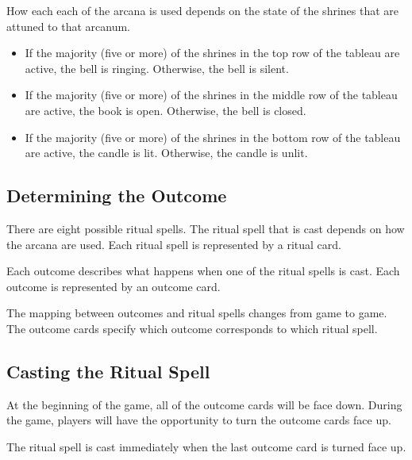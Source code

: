 \documentclass[10pt, parskip=half-, twoside]{scrartcl}
\begin{document}
How each each of the arcana is used depends on the state of the shrines that are attuned to that arcanum.
\begin{itemize}[itemindent=*, leftmargin=*]
\item If the majority (five or more) of the shrines in the top row of the tableau are active, the bell is ringing. Otherwise, the bell is silent.
\item If the majority (five or more) of the shrines in the middle row of the tableau are active, the book is open. Otherwise, the bell is closed.
\item If the majority (five or more) of the shrines in the bottom row of the tableau are active, the candle is lit. Otherwise, the candle is unlit.
\end{itemize}

\newpage

\subsection*{Determining the Outcome}
There are eight possible ritual spells.
The ritual spell that is cast depends on how the arcana are used.
Each ritual spell is represented by a ritual card.

Each outcome describes what happens when one of the ritual spells is cast. 
Each outcome is represented by an outcome card.

The mapping between outcomes and ritual spells changes from game to game. The outcome cards specify which outcome corresponds to which ritual spell.

\subsection*{Casting the Ritual Spell}
At the beginning of the game, all of the outcome cards will be face down. During the game, players will have the opportunity to turn the outcome cards face up.

The ritual spell is cast immediately when the last outcome card is turned face up.

\newpage
\end{document}
